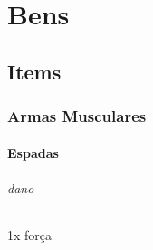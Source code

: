 \part{Bens}
\chapter{Items}
\section{Armas Musculares}
\subsection{Espadas}
\paragraph{dano} 1x força
%
%
%
%
%
%
%
